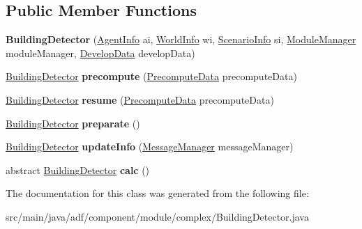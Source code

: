 \subsection*{Public Member Functions}
\begin{DoxyCompactItemize}
\item 
\hypertarget{classadf_1_1component_1_1module_1_1complex_1_1BuildingDetector_aec293c18a386b5eb4b2790a172a4b658}{}\label{classadf_1_1component_1_1module_1_1complex_1_1BuildingDetector_aec293c18a386b5eb4b2790a172a4b658} 
{\bfseries Building\+Detector} (\hyperlink{classadf_1_1agent_1_1info_1_1AgentInfo}{Agent\+Info} ai, \hyperlink{classadf_1_1agent_1_1info_1_1WorldInfo}{World\+Info} wi, \hyperlink{classadf_1_1agent_1_1info_1_1ScenarioInfo}{Scenario\+Info} si, \hyperlink{classadf_1_1agent_1_1module_1_1ModuleManager}{Module\+Manager} module\+Manager, \hyperlink{classadf_1_1agent_1_1develop_1_1DevelopData}{Develop\+Data} develop\+Data)
\item 
\hypertarget{classadf_1_1component_1_1module_1_1complex_1_1BuildingDetector_ab2234c4c8272453eead244b01df179d3}{}\label{classadf_1_1component_1_1module_1_1complex_1_1BuildingDetector_ab2234c4c8272453eead244b01df179d3} 
\hyperlink{classadf_1_1component_1_1module_1_1complex_1_1BuildingDetector}{Building\+Detector} {\bfseries precompute} (\hyperlink{classadf_1_1agent_1_1precompute_1_1PrecomputeData}{Precompute\+Data} precompute\+Data)
\item 
\hypertarget{classadf_1_1component_1_1module_1_1complex_1_1BuildingDetector_a2f05d2f850a011165556239e27b0ac28}{}\label{classadf_1_1component_1_1module_1_1complex_1_1BuildingDetector_a2f05d2f850a011165556239e27b0ac28} 
\hyperlink{classadf_1_1component_1_1module_1_1complex_1_1BuildingDetector}{Building\+Detector} {\bfseries resume} (\hyperlink{classadf_1_1agent_1_1precompute_1_1PrecomputeData}{Precompute\+Data} precompute\+Data)
\item 
\hypertarget{classadf_1_1component_1_1module_1_1complex_1_1BuildingDetector_a335d77b425417f1c100f885e86df3854}{}\label{classadf_1_1component_1_1module_1_1complex_1_1BuildingDetector_a335d77b425417f1c100f885e86df3854} 
\hyperlink{classadf_1_1component_1_1module_1_1complex_1_1BuildingDetector}{Building\+Detector} {\bfseries preparate} ()
\item 
\hypertarget{classadf_1_1component_1_1module_1_1complex_1_1BuildingDetector_adc80809fbcc1981ee903ea82e282bf2b}{}\label{classadf_1_1component_1_1module_1_1complex_1_1BuildingDetector_adc80809fbcc1981ee903ea82e282bf2b} 
\hyperlink{classadf_1_1component_1_1module_1_1complex_1_1BuildingDetector}{Building\+Detector} {\bfseries update\+Info} (\hyperlink{classadf_1_1agent_1_1communication_1_1MessageManager}{Message\+Manager} message\+Manager)
\item 
\hypertarget{classadf_1_1component_1_1module_1_1complex_1_1BuildingDetector_a5bf336bb16e60b3c29b2d640366daf0d}{}\label{classadf_1_1component_1_1module_1_1complex_1_1BuildingDetector_a5bf336bb16e60b3c29b2d640366daf0d} 
abstract \hyperlink{classadf_1_1component_1_1module_1_1complex_1_1BuildingDetector}{Building\+Detector} {\bfseries calc} ()
\end{DoxyCompactItemize}


The documentation for this class was generated from the following file\+:\begin{DoxyCompactItemize}
\item 
src/main/java/adf/component/module/complex/Building\+Detector.\+java\end{DoxyCompactItemize}
